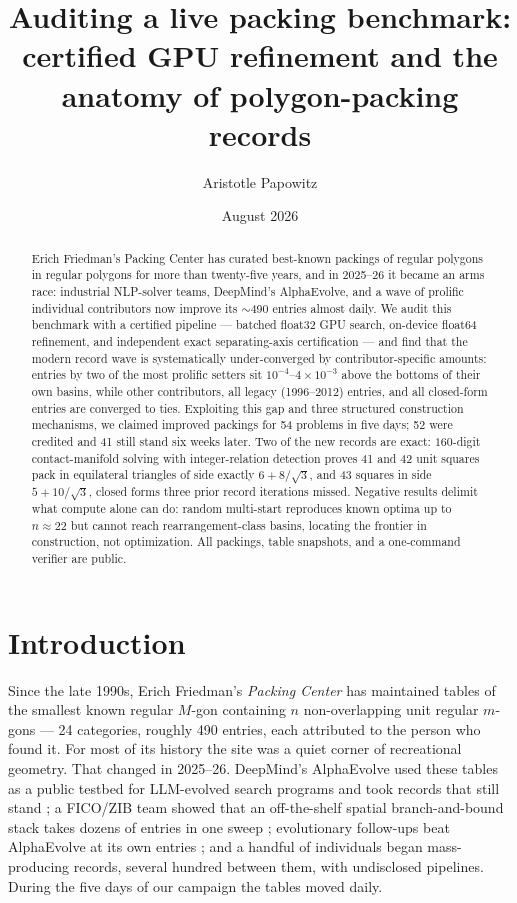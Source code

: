 \documentclass[11pt]{article}
\title{Auditing a live packing benchmark:\\
certified GPU refinement and the anatomy of polygon-packing records}
\author{Aristotle Papowitz}
\date{August 2026}
\begin{document}
\maketitle

\begin{abstract}
\noindent
Erich Friedman's Packing Center has curated best-known packings of regular
polygons in regular polygons for more than twenty-five years, and in 2025--26 it
became an arms race: industrial NLP-solver teams, DeepMind's AlphaEvolve, and a
wave of prolific individual contributors now improve its $\sim$490 entries
almost daily. We audit this benchmark with a certified pipeline --- batched
float32 GPU search, on-device float64 refinement, and independent exact
separating-axis certification --- and find that the modern record wave is
systematically under-converged by contributor-specific amounts: entries by two
of the most prolific setters sit $10^{-4}$--$4\times10^{-3}$ above the bottoms
of their own basins, while other contributors, all legacy (1996--2012) entries,
and all closed-form entries are converged to ties. Exploiting this gap and three
structured construction mechanisms, we claimed improved packings for 54 problems
in five days; 52 were credited and 41 still stand six weeks later. Two of the
new records are exact: $160$-digit contact-manifold solving with integer-relation
detection proves 41 and 42 unit squares pack in equilateral triangles of side
exactly $6+8/\sqrt{3}$, and 43 squares in side $5+10/\sqrt{3}$, closed forms
three prior record iterations missed. Negative results delimit what compute
alone can do: random multi-start reproduces known optima up to $n\approx22$ but
cannot reach rearrangement-class basins, locating the frontier in construction,
not optimization. All packings, table snapshots, and a one-command verifier are
public.
\end{abstract}

\section{Introduction}\label{sec:intro}

Since the late 1990s, Erich Friedman's \emph{Packing Center}
\cite{friedman-site,friedman-survey} has maintained tables of the smallest known
regular $M$-gon containing $n$ non-overlapping unit regular $m$-gons ---
24 categories, roughly 490 entries, each attributed to the person who found it.
For most of its history the site was a quiet corner of recreational geometry.
That changed in 2025--26. DeepMind's AlphaEvolve used these tables as a public
testbed for LLM-evolved search programs and took records that still stand
\cite{alphaevolve}; a FICO/ZIB team showed that an off-the-shelf spatial
branch-and-bound stack takes dozens of entries in one sweep
\cite{berthold-oob,berthold-hex}; evolutionary follow-ups beat AlphaEvolve at
its own entries \cite{improvevolve}; and a handful of individuals began
mass-producing records, several hundred between them, with undisclosed
pipelines. During the five days of our campaign the tables moved daily.
\end{document}
